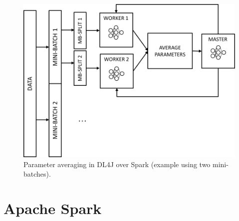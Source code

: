 \documentclass[journal]{IEEEtran}
\begin{document}
\begin{figure}
\begin{center}
\centerline{\includegraphics[width=1.0\linewidth]{img/distributed.png}}
\caption{Parameter averaging in DL4J over Spark (example using two mini-batches).}
\label{fig:dl4j}
\end{center}
\vspace{-0.5cm}
\end{figure}


\section{Apache Spark}
\label{sec:spark}
\end{document}
